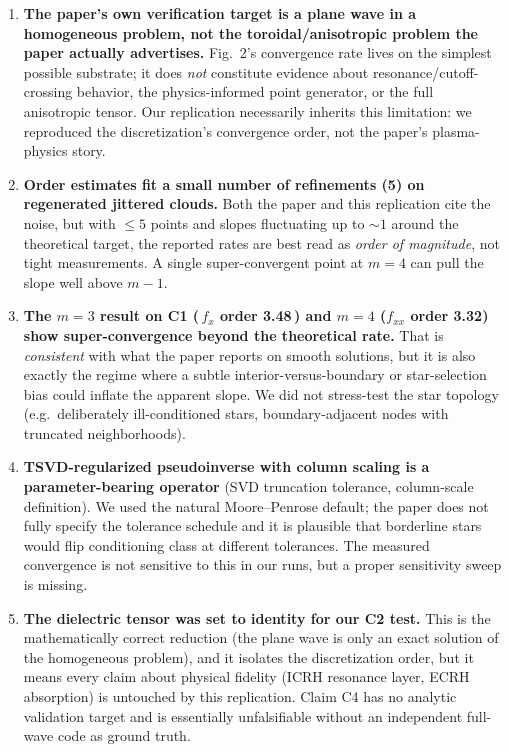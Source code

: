 \documentclass[11pt]{article}
\begin{document}
\begin{enumerate}[leftmargin=1.4em]
  \item \textbf{The paper's own verification target is a plane wave in a
    homogeneous problem, not the toroidal/anisotropic problem the paper
    actually advertises.} Fig.~2's convergence rate lives on the simplest
    possible substrate; it does \emph{not} constitute evidence about
    resonance/cutoff-crossing behavior, the physics-informed point generator,
    or the full anisotropic tensor. Our replication necessarily inherits
    this limitation: we reproduced the discretization's convergence order,
    not the paper's plasma-physics story.

  \item \textbf{Order estimates fit a small number of refinements
    (5) on regenerated jittered clouds.} Both the paper and this
    replication cite the noise, but with $\leq 5$ points and slopes
    fluctuating up to $\sim 1$ around the theoretical target, the reported
    rates are best read as \emph{order of magnitude}, not tight
    measurements. A single super-convergent point at $m=4$ can pull the
    slope well above $m-1$.

  \item \textbf{The $m=3$ result on C1 (\,$f_x$ order 3.48\,) and $m=4$
    ($f_{xx}$ order 3.32) show super-convergence beyond the theoretical
    rate.} That is \emph{consistent} with what the paper reports on smooth
    solutions, but it is also exactly the regime where a subtle
    interior-versus-boundary or star-selection bias could inflate the
    apparent slope. We did not stress-test the star topology (e.g.\ deliberately
    ill-conditioned stars, boundary-adjacent nodes with truncated neighborhoods).

  \item \textbf{TSVD-regularized pseudoinverse with column scaling is a
    parameter-bearing operator} (SVD truncation tolerance, column-scale
    definition). We used the natural Moore--Penrose default; the paper does
    not fully specify the tolerance schedule and it is plausible that
    borderline stars would flip conditioning class at different tolerances.
    The measured convergence is not sensitive to this in our runs, but a
    proper sensitivity sweep is missing.

  \item \textbf{The dielectric tensor was set to identity for our C2 test.}
    This is the mathematically correct reduction (the plane wave is only an
    exact solution of the homogeneous problem), and it isolates the
    discretization order, but it means every claim about physical fidelity
    (ICRH resonance layer, ECRH absorption) is untouched by this replication.
    Claim C4 has no analytic validation target and is essentially
    unfalsifiable without an independent full-wave code as ground truth.


\end{enumerate}
\end{document}
